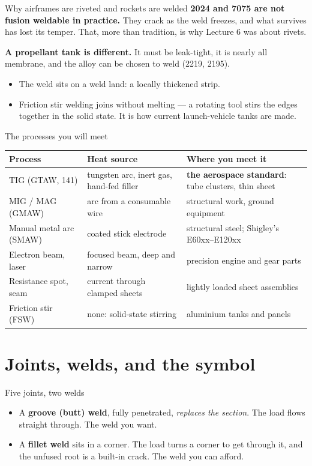 \documentclass[aspectratio=169,10pt]{beamer}
\begin{document}
\begin{frame}{Why airframes are riveted and rockets are welded}
\textbf{2024 and 7075 are not fusion weldable in practice.} They crack as the weld freezes, and
what survives has lost its temper. That, more than tradition, is why Lecture 6 was about rivets.

\vfill
\textbf{A propellant tank is different.} It must be leak-tight, it is nearly all membrane, and the
alloy can be chosen to weld (2219, 2195).
\begin{itemize}
  \item The weld sits on a \alert{weld land}: a locally thickened strip.
  \item \alert{Friction stir welding} joins without melting --- a rotating tool stirs the edges
        together in the solid state. It is how current launch-vehicle tanks are made.
\end{itemize}
\end{frame}

\begin{frame}{The processes you will meet}
\centering\footnotesize
\begin{tabular}{@{}lll@{}}
\toprule
\textbf{Process} & \textbf{Heat source} & \textbf{Where you meet it}\\
\midrule
TIG (GTAW, 141) & tungsten arc, inert gas, hand-fed filler & \textbf{the aerospace standard}: tube clusters, thin sheet\\
MIG / MAG (GMAW) & arc from a consumable wire & structural work, ground equipment\\
Manual metal arc (SMAW) & coated stick electrode & structural steel; Shigley's E60xx--E120xx\\
Electron beam, laser & focused beam, deep and narrow & precision engine and gear parts\\
Resistance spot, seam & current through clamped sheets & lightly loaded sheet assemblies\\
Friction stir (FSW) & none: solid-state stirring & aluminium tanks and panels\\
\bottomrule
\end{tabular}
\end{frame}

\section{Joints, welds, and the symbol}

\begin{frame}{Five joints, two welds}
\centering
\resizebox{0.9\textwidth}{!}{}

\vfill\raggedright
\begin{itemize}
  \item A \textbf{groove (butt) weld}, fully penetrated, \emph{replaces the section}. The load flows
        straight through. \alert{The weld you want.}
  \item A \textbf{fillet weld} sits in a corner. The load turns a corner to get through it, and the
        unfused root is a built-in crack. \alert{The weld you can afford.}
\end{itemize}
\end{frame}
\end{document}
